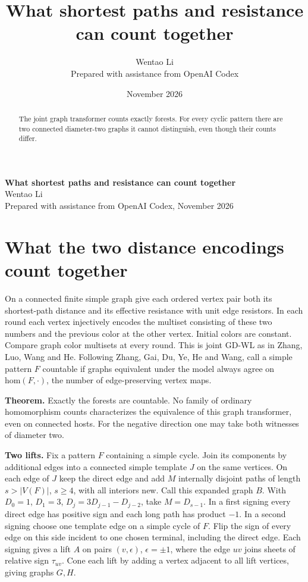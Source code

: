 \documentclass[10pt]{article}
\title{What shortest paths and resistance can count together}
\author{Wentao Li\\{\small Prepared with assistance from OpenAI Codex}}
\date{November 2026}
\begin{document}
\begin{center}{\Large\bfseries What shortest paths and resistance can count together}\\[3pt]Wentao Li\\{\small Prepared with assistance from OpenAI Codex, November 2026}\end{center}
\begin{abstract}
The joint graph transformer counts exactly forests. For every cyclic pattern there are two connected diameter-two graphs it cannot distinguish, even though their counts differ.
\end{abstract}
\section*{What the two distance encodings count together}
On a connected finite simple graph give each ordered vertex pair both its shortest-path distance and its effective resistance with unit edge resistors. In each round each vertex injectively encodes the multiset consisting of these two numbers and the previous color at the other vertex. Initial colors are constant. Compare graph color multisets at every round. This is joint GD-WL as in Zhang, Luo, Wang and He. Following Zhang, Gai, Du, Ye, He and Wang, call a simple pattern $F$ countable if graphs equivalent under the model always agree on $\mathrm{hom}(F,\cdot)$, the number of edge-preserving vertex maps.

\textbf{Theorem.} Exactly the forests are countable. No family of ordinary homomorphism counts characterizes the equivalence of this graph transformer, even on connected hosts. For the negative direction one may take both witnesses of diameter two.

\textbf{Two lifts.} Fix a pattern $F$ containing a simple cycle. Join its components by additional edges into a connected simple template $J$ on the same vertices. On each edge of $J$ keep the direct edge and add $M$ internally disjoint paths of length $s>|V(F)|$, $s\ge4$, with all interiors new. Call this expanded graph $B$. With $D_0=1$, $D_1=3$, $D_j=3D_{j-1}-D_{j-2}$, take $M=D_{s-1}$. In a first signing every direct edge has positive sign and each long path has product $-1$. In a second signing choose one template edge on a simple cycle of $F$. Flip the sign of every edge on this side incident to one chosen terminal, including the direct edge. Each signing gives a lift $A$ on pairs $(v,\epsilon)$, $\epsilon=\pm1$, where the edge $uv$ joins sheets of relative sign $\tau_{uv}$. Cone each lift by adding a vertex adjacent to all lift vertices, giving graphs $G,H$.
\end{document}
